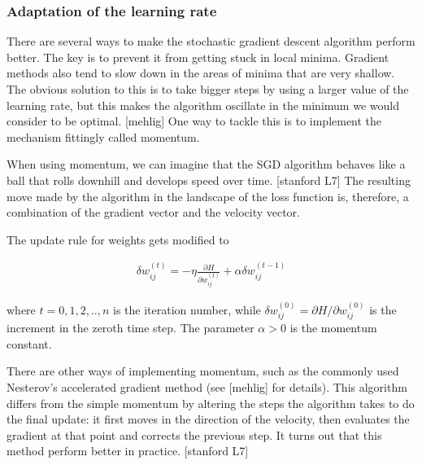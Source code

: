 \subsubsection{Adaptation of the learning rate}

There are several ways to make the stochastic gradient descent algorithm perform better. The key is to prevent it from getting stuck in local minima. Gradient methods also tend to slow down in the areas of minima that are very shallow. The obvious solution to this is to take bigger steps by using a larger value of the learning rate, but this makes the algorithm oscillate in the minimum we would consider to be optimal. [mehlig] One way to tackle this is to implement the mechanism fittingly called momentum. 

When using momentum, we can imagine that the SGD algorithm behaves like a ball that rolls downhill and develops speed over time. [stanford L7] The resulting move made by the algorithm in the landscape of the loss function is, therefore, a combination of the gradient vector and the velocity vector. 

\noindent The update rule for weights gets modified to

\begin{gather}
\delta w_{ij}^{(t)} = - \eta \frac{\partial H}{\partial w_{ij}^{(t)}} + \alpha \delta w_{ij}^{(t-1)} 
\end{gather}

\noindent where $ t=0,1,2,..,n $ is the iteration number, while $ \delta w_{ij}^{(0)} = \partial H / \partial w_{ij}^{(0)} $ is the increment in the zeroth time step. The parameter $ \alpha > 0$ is the momentum constant. 

There are other ways of implementing momentum, such as the commonly used Nesterov's accelerated gradient method (see [mehlig] for details). This algorithm differs from the simple momentum by altering the steps the algorithm takes to do the final update: it first moves in the direction of the velocity, then evaluates the gradient at that point and corrects the previous step. It turns out that this method perform better in practice. [stanford L7]


